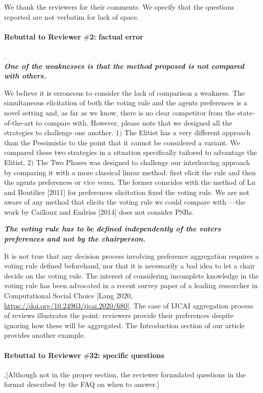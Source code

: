 \documentclass{article}
\begin{document}
	We thank the reviewers for their comments. We specify that the questions reported are not verbatim for lack of space. 
\paragraph{Rebuttal to Reviewer $\#$2: factual error}.\\
\textit{\textbf{One of the weaknesses is that the method proposed is not compared with others.}}

We believe it is erroneous to consider the lack of comparison a weakness. The simultaneous elicitation of both the voting rule and the agents preferences is a novel setting and, as far as we know, there is no clear competitor from the state-of-the-art to compare with. However, please note that we designed all the strategies to challenge one another. $1)$ The Elitist has a very different approach than the Pessimistic to the point that it cannot be considered a variant. We compared these two strategies in a situation specifically tailored to advantage the Elitist. $2)$ The Two Phases was designed to challenge our interleaving approach by comparing it with a more classical linear method: first elicit the rule and then the agents preferences or vice versa. The former coincides with the method of Lu and Boutilier [2011] for preferences elicitation fixed the voting rule.
We are not aware of any method that elicits the voting rule we could compare with —the work by Cailloux and Endriss [2014] does not consider PSRs.

\textit{\textbf{The voting rule has to be defined independently of the voters preferences and not by the chairperson.}}

It is not true that any decision process involving preference aggregation requires a voting rule defined beforehand, nor that it is necessarily a bad idea to let a chair decide on the voting rule. The interest of considering incomplete knowledge in the voting rule has been advocated in a recent survey paper of a leading researcher in Computational Social Choice [Lang 2020, \url{https://doi.org/10.24963/ijcai.2020/680}]. The case of IJCAI aggregation process of reviews illustrates the point: reviewers provide their preferences despite ignoring how these will be aggregated. The Introduction section of our article provides another example.

\paragraph{Rebuttal to Reviewer $\#$32: specific questions}
.[Although not in the proper section, the reviewer formulated questions in the format described by the FAQ on when to answer.]
\end{document}
